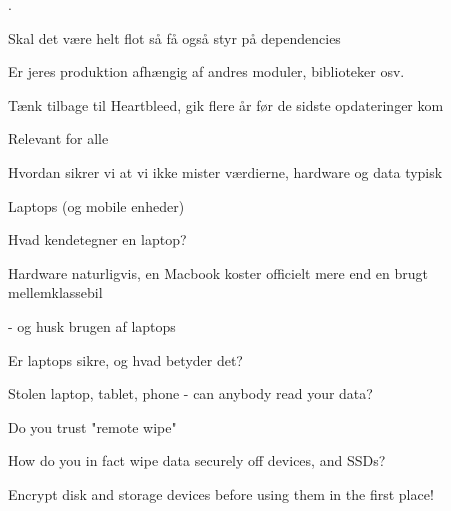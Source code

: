 \documentclass[Screen16to9,17pt]{foils}
\begin{document}

.

\begin{list2}
\item Skal det være helt flot så få også styr på dependencies
\item Er jeres produktion afhængig af andres moduler, biblioteker osv.
\item Tænk tilbage til Heartbleed, gik flere år før de sidste opdateringer kom
\end{list2}





\begin{list2}
\item Relevant for alle
\item Hvordan sikrer vi at vi ikke mister værdierne, hardware og data typisk
\end{list2}




\begin{list2}
\item Laptops (og mobile enheder)
\item Hvad kendetegner en laptop?
\item Hardware naturligvis, en Macbook koster officielt mere end en brugt mellemklassebil
\item - og husk brugen af laptops
\item Er laptops sikre, og hvad betyder det?
\end{list2}





\begin{list1}
\item Stolen laptop, tablet, phone - can anybody read your data?
\item Do you trust "remote wipe"
\item How do you in fact wipe data securely off devices, and SSDs?
\item Encrypt disk and storage devices before using them in the first place!
\end{list1}
\end{document}
